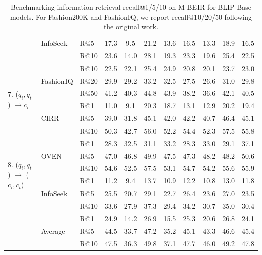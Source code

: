 \begin{table}[]
{\begin{tabular}{lll|cccc|cccc}
 & InfoSeek & R@5 & 17.3 & 9.5 & 21.2 & 13.6 & 16.5 & 13.3 & 18.9 & 16.5\\
 &  & R@10 & 23.6 & 14.0 & 28.1 & 19.3 & 23.3 & 19.6 & 25.4 & 22.5\\
 \midrule
\multirow{6}{*}{7. ($q_i, q_t$) $	\to c_i$} &  & R@10 & 22.5 & 22.1 & 25.4 & 24.9 & 20.8 & 20.1 & 23.7 & 23.0\\
 & FashionIQ & R@20 & 29.9 & 29.2 & 33.2 & 32.5 & 27.5 & 26.6 & 31.0 & 29.8\\
 &  & R@50 & 41.2 & 40.3 & 44.8 & 43.9 & 38.2 & 36.6 & 42.1 & 40.5\\
 \cmidrule{2-11}
 &  & R@1 & 11.0 & 9.1 & 20.3 & 18.7 & 13.1 & 12.9 & 20.2 & 19.4\\
 & CIRR & R@5 & 39.0 & 31.8 & 45.1 & 42.0 & 42.2 & 40.7 & 46.4 & 45.1\\
 &  & R@10 & 50.3 & 42.7 & 56.0 & 52.2 & 54.4 & 52.3 & 57.5 & 55.8\\
 \midrule
\multirow{6}{*}{8. ($q_i, q_t$) $	\to$ ($c_i, c_t$)} &  & R@1 & 28.3 & 32.5 & 31.1 & 33.2 & 28.3 & 33.0 & 29.1 & 37.1\\
 & OVEN & R@5 & 47.0 & 46.8 & 49.9 & 47.5 & 47.3 & 48.2 & 48.2 & 50.6\\
 &  & R@10 & 54.6 & 52.5 & 57.5 & 53.1 & 54.7 & 54.2 & 55.6 & 55.9\\
 \cmidrule{2-11}
 &  & R@1 & 11.2 & 9.4 & 13.7 & 10.9 & 12.2 & 10.8 & 13.0 & 11.8\\
 & InfoSeek & R@5 & 25.5 & 20.7 & 29.1 & 22.7 & 26.4 & 23.6 & 27.0 & 23.5\\
 &  & R@10 & 33.6 & 27.9 & 37.3 & 29.4 & 34.2 & 30.7 & 35.0 & 30.4\\
 \midrule
\multirow{3}{*}{-} &  & R@1 & 24.9 & 14.2 & 26.9 & 15.5 & 25.3 & 20.6 & 26.8 & 24.1\\
 & Average & R@5 & 44.5 & 33.7 & 47.2 & 35.2 & 45.1 & 43.3 & 46.6 & 45.4\\
 &  & R@10 & 47.5 & 36.3 & 49.8 & 37.1 & 47.7 & 46.0 & 49.2 & 47.8\\
 \bottomrule
\end{tabular}%
}
\caption{Benchmarking information retrieval recall@1/5/10 on M-BEIR for BLIP Base models. For Fashion200K and FashionIQ, we report recall@10/20/50 following the original work.}
\label{tab:blip_base}
\end{table}